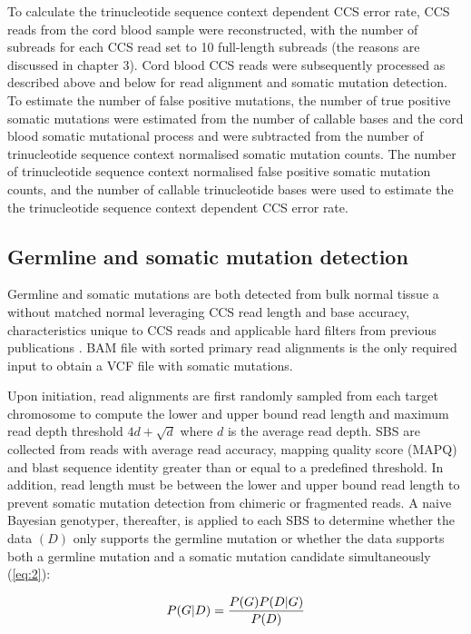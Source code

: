 To calculate the trinucleotide sequence context dependent CCS error rate, CCS reads from the cord blood sample were reconstructed, with the number of subreads for each CCS read set to 10 full-length subreads (the reasons are discussed in chapter 3). Cord blood CCS reads were subsequently processed as described above and below for read alignment and somatic mutation detection. To estimate the number of false positive mutations, the number of true positive somatic mutations were estimated from the number of callable bases and the cord blood somatic mutational process \cite{Mitchell2022-ry} and were subtracted from the number of trinucleotide sequence context normalised somatic mutation counts. The number of trinucleotide sequence context normalised false positive somatic mutation counts, and the number of callable trinucleotide bases were used to estimate the the trinucleotide sequence context dependent CCS error rate. 

\subsection{Germline and somatic mutation detection}

Germline and somatic mutations are both detected from bulk normal tissue a without matched normal leveraging CCS read length and base accuracy, characteristics unique to CCS reads and applicable hard filters from previous publications \cite{DePristo2011-vf, Kim2018-qi}. BAM file with sorted primary read alignments is the only required input to obtain a VCF file with somatic mutations. 



Upon initiation, read alignments are first randomly sampled from each target chromosome to compute the lower and upper bound read length and maximum read depth threshold $4d + \sqrt{d}$ where $d$ is the average read depth. SBS are collected from reads with average read accuracy, mapping quality score (MAPQ) and blast sequence identity greater than or equal to a predefined threshold. In addition, read length must be between the lower and upper bound read length to prevent somatic mutation detection from chimeric or fragmented reads. A naive Bayesian genotyper, thereafter, is applied to each SBS to determine whether the data $(D)$ only supports the germline mutation or whether the data supports both a germline mutation and a somatic mutation candidate simultaneously (\ref{eq:2}):

\begin{equation} \label{eq:2}
P(G|D) = \frac{P(G)P(D|G)}{P(D)} \smallskip
\end{equation}

